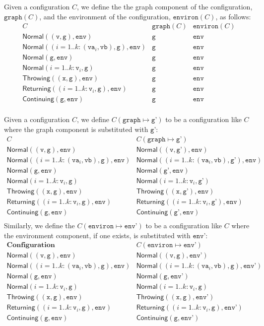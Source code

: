 \documentclass{book}
\newcommand\graphof[1]{\texttt{graph}({#1})}
\newcommand\withgraph[2]{{#1}(\texttt{graph}\mapsto{#2})}
\newcommand\environof[1]{\texttt{environ}({#1})}
\newcommand\withenviron[2]{{#1}(\texttt{environ}\mapsto{#2})}
\newcommand\Normal[0]{\textsf{Normal}}
\newcommand\Throwing[0]{\textsf{Throwing}}
\newcommand\Continuing[0]{\textsf{Continuing}}
\newcommand\Returning[0]{\textsf{Returning}}
\newcommand\env[0]{\texttt{env}}
\newcommand\envp[0]{\texttt{env'}}
\newcommand\vg[0]{\texttt{g}}
\newcommand\vgp[0]{\texttt{g'}}
\newcommand\vv[0]{\texttt{v}}
\newcommand\vx[0]{\texttt{x}}
\begin{document}
Given a configuration $C$, we define the the graph component of the configuration, $\graphof{C}$,
and the environment of the configuration, $\environof{C}$, as follows:
\[
\begin{array}{lcc}
  C & \graphof{C} & \environof{C}\\
  \hline
  \Normal((\vv,\vg), \env) & \vg & \env\\
  \Normal((i=1..k: (\texttt{va}_i,\texttt{vb}),\vg), \env) & \vg & \env\\
  \Normal(\vg, \env) & \vg & \env\\
  \Normal(i=1..k: \vv_i, \vg) & \vg & \env\\
  \Throwing((\vx,\vg), \env) & \vg & \env\\
  \Returning((i=1..k: \vv_i,\vg), \env) & \vg & \env\\
  \Continuing(\vg, \env) & \vg & \env\\
\end{array}
\]

Given a configuration $C$, we define $\withgraph{C}{\vgp}$ to be a configuration
like $C$ where the graph component is substituted with $\vgp$:
\[
\begin{array}{ll}
  C & \withgraph{C}{\vgp}\\
  \hline
  \Normal((\vv,\vg), \env) & \Normal((\vv,\vgp), \env)\\
  \Normal((i=1..k: (\texttt{va}_i,\texttt{vb}),\vg), \env) & \Normal((i=1..k: (\texttt{va}_i,\texttt{vb}),\vgp), \env)\\
  \Normal(\vg, \env) & \Normal(\vgp, \env)\\
  \Normal(i=1..k: \vv_i, \vg) & \Normal(i=1..k: \vv_i, \vgp)\\
  \Throwing((\vx,\vg), \env) & \Throwing((\vx,\vgp), \env)\\
  \Returning((i=1..k: \vv_i,\vg), \env) & \Returning((i=1..k: \vv_i,\vgp), \env)\\
  \Continuing(\vg, \env) & \Continuing(\vgp, \env)\\
\end{array}
\]
Similarly, we define the $\withenviron{C}{\envp}$ to be a configuration
like $C$ where the environment component, if one exists, is substituted with $\envp$:
\[
\begin{array}{ll}
  \textbf{Configuration} & \withenviron{C}{\envp}\\
  \hline
  \Normal((\vv,\vg), \env) & \Normal((\vv,\vg), \envp)\\
  \Normal((i=1..k: (\texttt{va}_i,\texttt{vb}),\vg), \env) & \Normal((i=1..k: (\texttt{va}_i,\texttt{vb}),\vg), \envp)\\
  \Normal(\vg, \env) & \Normal(\vg, \envp)\\
  \Normal(i=1..k: \vv_i, \vg) & \Normal(i=1..k: \vv_i, \vg)\\
  \Throwing((\vx,\vg), \env) & \Throwing((\vx,\vg), \envp)\\
  \Returning((i=1..k: \vv_i,\vg), \env) & \Returning((i=1..k: \vv_i,\vg), \envp)\\
  \Continuing(\vg, \env) & \Continuing(\vg, \envp)\\
\end{array}
\]
\end{document}
